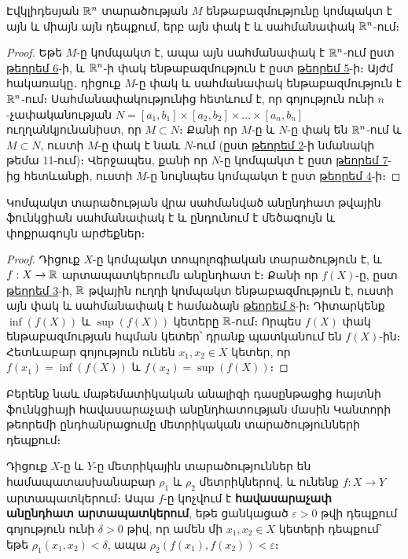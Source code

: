 \documentclass[./main.tex]{subfiles}
\begin{document}
\begin{theorem}\label{ch16thm8}
Էվկլիդեսյան $\mathbb{R}^n$ տարածության $M$ ենթաբազմությունը կոմպակտ է այն և միայն այն դեպքում, երբ այն փակ է և սահմանափակ $\mathbb{R}^n$-ում։
\end{theorem} 
\begin{proof}
Եթե $M$-ը կոմպակտ է, ապա այն սահմանափակ է $\mathbb{R}^n$-ում ըստ \hyperref[ch16thm6]{թեորեմ 6}-ի, և $\mathbb{R}^n$-ի փակ ենթաբազմություն է ըստ \hyperref[ch16thm5]{թեորեմ 5}-ի։ Այժմ հակառակը․ դիցուք $M$-ը փակ և սահմանափակ ենթաբազմություն է $\mathbb{R}^n$-ում։ Սահմանա\-փա\-կու\-թյունից հետևում է, որ գոյություն ունի $n$-չափականության $ N=[ a_1,b_1 ]\times [ a_2,b_2 ] \times \dots \times [ a_n,b_n ]$  ուղ\-ղանկ\-յու\-նա\-նիստ, որ $M\subset N$։ Քանի որ $M$-ը և $N$-ը փակ են $\mathbb{R}^n$-ում և $M\subset N$, ուստի $M$-ը փակ է նաև $N$-ում (ըստ \hyperref[ch11thm2]{թեորեմ 2}-ի նմանակի թեմա 11-ում)։ Վերջապես, քանի որ $N$-ը կոմպակտ է ըստ \hyperref[ch16thm7]{թեորեմ 7}-ից հետևանքի, ուստի $M$-ը նույնպես կոմպակտ է ըստ \hyperref[ch16thm4]{թեորեմ 4}-ի։
\end{proof}

\begin{theorem}\label{ch16thm9} 
Կոմպակտ տարածության վրա սահմանված ան\-ընդ\-հատ թվային ֆունկցիան սահմանափակ է և ընդունում է մեծագույն և փոքրագույն արժեքներ։
\end{theorem}

\begin{proof}
Դիցուք $X$-ը կոմպակտ տոպոլոգիական տարածություն է, և ${f:X\rightarrow \mathbb{R}}$ արտապատկերումն անընդհատ է։ Քանի որ $f(X)$-ը, ըստ \hyperref[ch16thm3]{թեորեմ 3}-ի, $\mathbb{R}$ թվային ուղղի կոմպակտ ենթաբազմություն է, ուստի այն փակ և սահմանափակ է համաձայն \hyperref[ch16thm8]{թեորեմ 8}-ի։ Դիտարկենք $\inf(f(X))$ և $\sup⁡(f(X))$ կետերը $\mathbb{R}$-ում։ Որպես $f(X)$ փակ ենթաբազմության հպման կետեր՝ դրանք պատկանում են $f(X)$-ին։ Հետևաբար գոյություն ունեն $x_1,x_2\in X$ կետեր, որ $f(x_1)=\inf(f(X))$ և $f(x_2)=\sup(f(X))$։ 
\end{proof}

\par Բերենք նաև մաթեմատիկական անալիզի դասընթացից հայտնի ֆունկցիայի հա\-վա\-սարաչափ անընդհատության մասին Կանտորի թեորեմի ընդհանրացումը մետ\-րի\-կա\-կան տարածությունների դեպքում։

\begin{definition}
Դիցուք $X$-ը և $Y$-ը մետրիկային տարածություններ են համա\-պա\-տաս\-խա\-նա\-բար $\rho_1$ և $\rho_2$ մետրիկներով, և ունենք $f: X \to Y$ արտապատկերում։ Ապա $f$-ը կոչվում է \textbf{հավասարաչափ անընդհատ արտապատկերում}, եթե ցանկացած $\varepsilon > 0$ թվի դեպքում գոյություն ունի $\delta > 0$ թիվ, որ ամեն մի $x_1, x_2 \in X$ կետերի դեպքում՝ եթե $\rho_1(x_1, x_2) < \delta$, ապա $\rho_2(f(x_1), f(x_2)) < \varepsilon$։
\end{definition}
\end{document}
